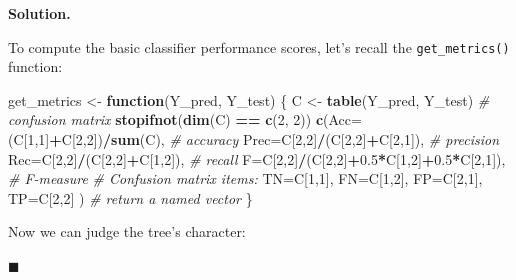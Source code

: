 \documentclass[10pt,b5paper,krantz1]{krantz}
\newenvironment{Shaded}{\begin{snugshade}}{\end{snugshade}}
\newcommand{\CommentTok}[1]{\textcolor[rgb]{0.37,0.37,0.37}{\textit{#1}}}
\newcommand{\ControlFlowTok}[1]{\textcolor[rgb]{0.27,0.27,0.27}{\textbf{#1}}}
\newcommand{\DataTypeTok}[1]{\textcolor[rgb]{0.27,0.27,0.27}{#1}}
\newcommand{\DecValTok}[1]{\textcolor[rgb]{0.06,0.06,0.06}{#1}}
\newcommand{\FloatTok}[1]{\textcolor[rgb]{0.06,0.06,0.06}{#1}}
\newcommand{\KeywordTok}[1]{\textcolor[rgb]{0.27,0.27,0.27}{\textbf{#1}}}
\newcommand{\NormalTok}[1]{#1}
\newcommand{\OperatorTok}[1]{\textcolor[rgb]{0.43,0.43,0.43}{\textbf{#1}}}
\newcommand{\StringTok}[1]{\textcolor[rgb]{0.5,0.5,0.5}{#1}}
\newenvironment{solution}{%
\bigskip\noindent\textbf{Solution. }%
\it\ignorespaces%
\ignorespaces%
}{\ignorespaces%
\hfill$\blacksquare$%
}
\begin{document}
\begin{solution}
To compute the basic classifier performance scores,
let's recall the \texttt{get\_metrics()} function:

\begin{Shaded}
\begin{Highlighting}[]
\NormalTok{get_metrics <-}\StringTok{ }\ControlFlowTok{function}\NormalTok{(Y_pred, Y_test)}
\NormalTok{\{}
\NormalTok{    C <-}\StringTok{ }\KeywordTok{table}\NormalTok{(Y_pred, Y_test) }\CommentTok{# confusion matrix}
    \KeywordTok{stopifnot}\NormalTok{(}\KeywordTok{dim}\NormalTok{(C) }\OperatorTok{==}\StringTok{ }\KeywordTok{c}\NormalTok{(}\DecValTok{2}\NormalTok{, }\DecValTok{2}\NormalTok{))}
    \KeywordTok{c}\NormalTok{(}\DataTypeTok{Acc=}\NormalTok{(C[}\DecValTok{1}\NormalTok{,}\DecValTok{1}\NormalTok{]}\OperatorTok{+}\NormalTok{C[}\DecValTok{2}\NormalTok{,}\DecValTok{2}\NormalTok{])}\OperatorTok{/}\KeywordTok{sum}\NormalTok{(C), }\CommentTok{# accuracy}
      \DataTypeTok{Prec=}\NormalTok{C[}\DecValTok{2}\NormalTok{,}\DecValTok{2}\NormalTok{]}\OperatorTok{/}\NormalTok{(C[}\DecValTok{2}\NormalTok{,}\DecValTok{2}\NormalTok{]}\OperatorTok{+}\NormalTok{C[}\DecValTok{2}\NormalTok{,}\DecValTok{1}\NormalTok{]), }\CommentTok{# precision}
      \DataTypeTok{Rec=}\NormalTok{C[}\DecValTok{2}\NormalTok{,}\DecValTok{2}\NormalTok{]}\OperatorTok{/}\NormalTok{(C[}\DecValTok{2}\NormalTok{,}\DecValTok{2}\NormalTok{]}\OperatorTok{+}\NormalTok{C[}\DecValTok{1}\NormalTok{,}\DecValTok{2}\NormalTok{]), }\CommentTok{# recall}
      \DataTypeTok{F=}\NormalTok{C[}\DecValTok{2}\NormalTok{,}\DecValTok{2}\NormalTok{]}\OperatorTok{/}\NormalTok{(C[}\DecValTok{2}\NormalTok{,}\DecValTok{2}\NormalTok{]}\OperatorTok{+}\FloatTok{0.5}\OperatorTok{*}\NormalTok{C[}\DecValTok{1}\NormalTok{,}\DecValTok{2}\NormalTok{]}\OperatorTok{+}\FloatTok{0.5}\OperatorTok{*}\NormalTok{C[}\DecValTok{2}\NormalTok{,}\DecValTok{1}\NormalTok{]), }\CommentTok{# F-measure}
      \CommentTok{# Confusion matrix items:}
      \DataTypeTok{TN=}\NormalTok{C[}\DecValTok{1}\NormalTok{,}\DecValTok{1}\NormalTok{], }\DataTypeTok{FN=}\NormalTok{C[}\DecValTok{1}\NormalTok{,}\DecValTok{2}\NormalTok{],}
      \DataTypeTok{FP=}\NormalTok{C[}\DecValTok{2}\NormalTok{,}\DecValTok{1}\NormalTok{], }\DataTypeTok{TP=}\NormalTok{C[}\DecValTok{2}\NormalTok{,}\DecValTok{2}\NormalTok{]}
\NormalTok{    ) }\CommentTok{# return a named vector}
\NormalTok{\}}
\end{Highlighting}
\end{Shaded}

Now we can judge the tree's character:


\end{solution}
\end{document}
